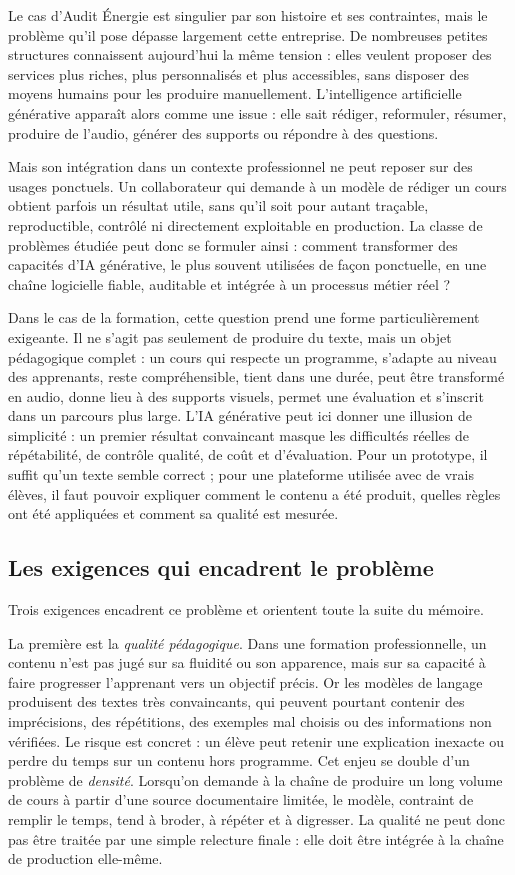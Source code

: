 Le cas d'Audit Énergie est singulier par son histoire et ses contraintes, mais le problème
qu'il pose dépasse largement cette entreprise. De nombreuses petites structures connaissent
aujourd'hui la même tension : elles veulent proposer des services plus riches, plus
personnalisés et plus accessibles, sans disposer des moyens humains pour les produire
manuellement. L'intelligence artificielle générative apparaît alors comme une issue : elle
sait rédiger, reformuler, résumer, produire de l'audio, générer des supports ou répondre à
des questions.

Mais son intégration dans un contexte professionnel ne peut reposer sur des usages
ponctuels. Un collaborateur qui demande à un modèle de rédiger un cours obtient parfois
un résultat utile, sans qu'il soit pour autant traçable, reproductible, contrôlé ni
directement exploitable en production. La classe de problèmes étudiée peut donc se
formuler ainsi : comment transformer des capacités d'IA générative, le plus souvent
utilisées de façon ponctuelle, en une chaîne logicielle fiable, auditable et intégrée à un
processus métier réel ?

Dans le cas de la formation, cette question prend une forme particulièrement exigeante. Il
ne s'agit pas seulement de produire du texte, mais un objet pédagogique complet : un cours
qui respecte un programme, s'adapte au niveau des apprenants, reste compréhensible,
tient dans une durée, peut être transformé en audio, donne lieu à des supports visuels,
permet une évaluation et s'inscrit dans un parcours plus large. L'IA générative peut ici
donner une illusion de simplicité : un premier résultat convaincant masque les difficultés
réelles de répétabilité, de contrôle qualité, de coût et d'évaluation. Pour un prototype, il
suffit qu'un texte semble correct ; pour une plateforme utilisée avec de vrais élèves, il faut
pouvoir expliquer comment le contenu a été produit, quelles règles ont été appliquées et
comment sa qualité est mesurée.

\subsection{Les exigences qui encadrent le problème}

Trois exigences encadrent ce problème et orientent toute la suite du mémoire.

La première est la \emph{qualité pédagogique}. Dans une formation professionnelle, un
contenu n'est pas jugé sur sa fluidité ou son apparence, mais sur sa capacité à faire
progresser l'apprenant vers un objectif précis. Or les modèles de langage produisent des
textes très convaincants, qui peuvent pourtant contenir des imprécisions, des répétitions,
des exemples mal choisis ou des informations non vérifiées. Le risque est concret : un
élève peut retenir une explication inexacte ou perdre du temps sur un contenu hors
programme. Cet enjeu se double d'un problème de \emph{densité}. Lorsqu'on demande à
la chaîne de produire un long volume de cours à partir d'une source documentaire limitée,
le modèle, contraint de remplir le temps, tend à broder, à répéter et à digresser. La qualité
ne peut donc pas être traitée par une simple relecture finale : elle doit être intégrée à la
chaîne de production elle-même.

